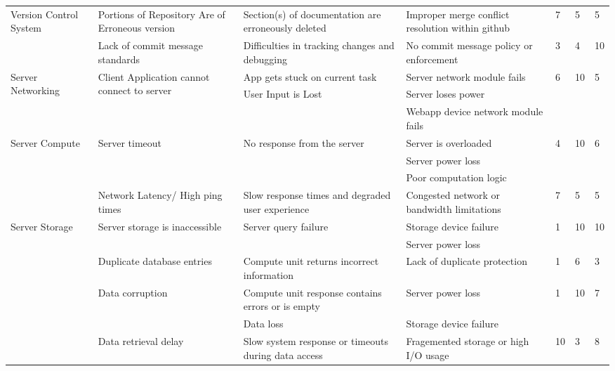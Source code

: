 \documentclass{article}
\begin{document}
\begin{landscape}
\begin{table}[]
{\begin{tabular}{|l|l|l|l|l|l|l|}
     &  &  &  &  &  &  \\ \hline
    \multirow{3}{*}{Version Control System} & \multirow{2}{*}{Portions of Repository Are of Erroneous version} & \multirow{2}{*}{Section(s) of documentation are erroneously deleted} & \multirow{2}{*}{Improper merge conflict resolution within github} & \multirow{2}{*}{7} & \multirow{2}{*}{5} & \multirow{2}{*}{5} \\
     &  &  &  &  &  &  \\ \cline{2-7} 
     & Lack of commit message standards & Difficulties in tracking changes and debugging & No commit message policy or enforcement & 3 & 4 & 10 \\ \hline
    \multirow{3}{*}{Server Networking} & \multirow{3}{*}{Client Application cannot connect to server} & App gets stuck on current task & Server network module fails & \multirow{3}{*}{6} & \multirow{3}{*}{10} & \multirow{3}{*}{5} \\
     &  & \multirow{2}{*}{User Input is Lost} & Server loses power &  &  &  \\
     &  &  & Webapp device network module fails &  &  &  \\ \hline
    \multirow{4}{*}{Server Compute} & \multirow{3}{*}{Server timeout} & \multirow{3}{*}{No response from the server} & Server is overloaded & \multirow{3}{*}{4} & \multirow{3}{*}{10} & \multirow{3}{*}{6} \\
     &  &  & Server power loss &  &  &  \\
     &  &  & Poor computation logic &  &  &  \\ \cline{2-7} 
     & Network Latency/ High ping times & Slow response times and degraded user experience & Congested network or bandwidth limitations & 7 & 5 & 5 \\ \hline
    \multirow{7}{*}{Server Storage} & \multirow{2}{*}{Server storage is inaccessible} & \multirow{2}{*}{Server query failure} & Storage device failure & \multirow{2}{*}{1} & \multirow{2}{*}{10} & \multirow{2}{*}{10} \\
     &  &  & Server power loss &  &  &  \\ \cline{2-7} 
     & \multirow{2}{*}{Duplicate database entries} & \multirow{2}{*}{Compute unit returns incorrect information} & \multirow{2}{*}{Lack of duplicate protection} & \multirow{2}{*}{1} & \multirow{2}{*}{6} & \multirow{2}{*}{3} \\
     &  &  &  &  &  &  \\ \cline{2-7} 
     & \multirow{2}{*}{Data corruption} & Compute unit response contains errors or is empty & Server power loss & \multirow{2}{*}{1} & \multirow{2}{*}{10} & \multirow{2}{*}{7} \\
     &  & Data loss & Storage device failure &  &  &  \\ \cline{2-7} 
     & Data retrieval delay & Slow system response or timeouts during data access & Fragemented storage or high I/O usage & 10 & 3 & 8 \\ \hline
    \end{tabular}
    }
\end{table}


\end{landscape}
\end{document}
